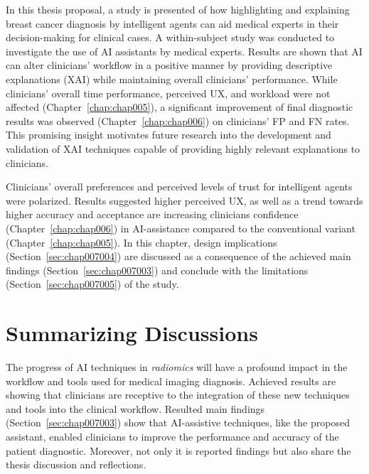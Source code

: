 \clearpage
\label{chap:chap007}

In this thesis proposal, a study is presented of how highlighting and explaining breast cancer diagnosis by intelligent agents can aid medical experts in their decision-making for clinical cases.
A within-subject study was conducted to investigate the use of \ac{AI} assistants by medical experts.
Results are shown that \ac{AI} can alter clinicians' workflow in a positive manner by providing descriptive explanations (\ac{XAI}) while maintaining overall clinicians' performance.
While clinicians' overall time performance, perceived \ac{UX}, and workload were not affected (Chapter~\ref{chap:chap005}), a significant improvement of final diagnostic results was observed (Chapter~\ref{chap:chap006}) on clinicians' \ac{FP} and \ac{FN} rates.
This promising insight motivates future research into the development and validation of \ac{XAI} techniques capable of providing highly relevant explanations to clinicians.

Clinicians' overall preferences and perceived levels of trust for intelligent agents were polarized.
Results suggested higher perceived \ac{UX}, as well as a trend towards higher accuracy and acceptance are increasing clinicians confidence (Chapter~\ref{chap:chap006}) in \ac{AI}-assistance compared to the conventional variant (Chapter~\ref{chap:chap005}).
In this chapter, design implications (Section~\ref{sec:chap007004}) are discussed as a consequence of the achieved main findings (Section~\ref{sec:chap007003}) and conclude with the limitations (Section~\ref{sec:chap007005}) of the study.

\section{Summarizing Discussions}
\label{sec:chap007001}

The progress of \ac{AI} techniques in {\it radiomics} will have a profound impact in the workflow and tools used for medical imaging diagnosis.  
Achieved results are showing that clinicians are receptive to the integration of these new techniques and tools into the clinical workflow.
Resulted main findings (Section~\ref{sec:chap007003}) show that \ac{AI}-assistive techniques, like the proposed assistant, enabled clinicians to improve the performance and accuracy of the patient diagnostic.
Moreover, not only it is reported findings but also share the thesis discussion and reflections.

